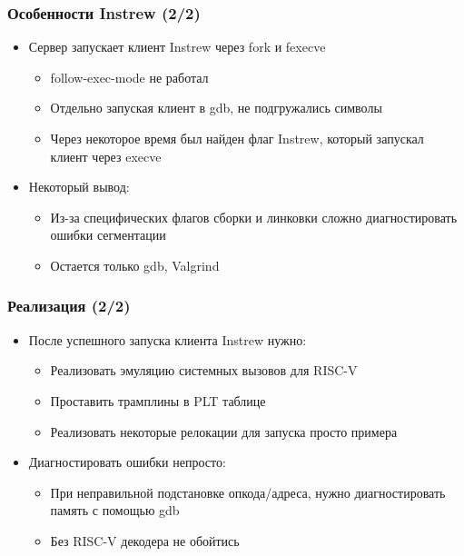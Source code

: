 \documentclass{beamer}
\begin{document}
\begin{frame}[fragile]
  \frametitle{Особенности Instrew (2/2)}
  \begin{itemize}
    \item Сервер запускает клиент Instrew через fork и fexecve
          \begin{itemize}
            \item follow-exec-mode не работал
            \item Отдельно запуская клиент в gdb, не подгружались символы
            \item Через некоторое время был найден флаг Instrew, который запускал клиент через execve
          \end{itemize}
    \item Некоторый вывод:
          \begin{itemize}
            \item Из-за специфических флагов сборки и линковки сложно диагностировать ошибки сегментации
            \item Остается только gdb, Valgrind 
          \end{itemize}
  \end{itemize}
\end{frame}


\begin{frame}[fragile]
  \frametitle{Реализация (2/2)}
  \begin{itemize}
    \item После успешного запуска клиента Instrew нужно:
          \begin{itemize}
            \item Реализовать эмуляцию системных вызовов для RISC-V
            \item Проставить трамплины в PLT таблице
            \item Реализовать некоторые релокации для запуска просто примера
          \end{itemize}
    \item Диагностировать ошибки непросто:
          \begin{itemize}
            \item При неправильной подстановке опкода/адреса, нужно диагностировать память с помощью gdb
            \item Без RISC-V декодера не обойтись
          \end{itemize}
  \end{itemize}
\end{frame}
\end{document}
